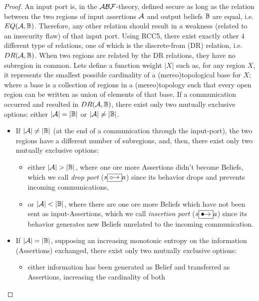 \begin{proof}
An input port is, in the $\mathcal{A}\mathcal{B}\mathcal{F}$-theory, defined secure as long as the relation
	between the two regions of input assertions $\mathcal{A}$ and
	output beliefs $\mathbb{B}$ are equal, i.e.
	$EQ(\mathcal{A},\mathbb{B})$. Therefore, any other relation
	should result in a weakness (related to an insecurity flaw) of that
	input port.  Using RCC5, there exist exactly other $4$ different type
	of relations, one of which is the discrete-from (DR) relation, i.e.
	$DR(\mathcal{A},\mathbb{B})$. When two regions are related by
	the DR relations, they have no subregion in common. Lets
	define a function weight $|X|$ such as, for any region $X$, it
	represents the smallest possible cardinality of a (mereo)topological base for
	$X$; where a base is a collection of regions in a (mereo)topology such that
	every open region can be written as union of elements of that base.  If
	a communication occurred and resulted in
	$DR(\mathcal{A},\mathbb{B})$, there exist only two mutually
	exclusive options: either $|\mathcal{A}|=|\mathbb{B}|$ or
	$|\mathcal{A}|\neq|\mathbb{B}|$. 
	\begin{itemize}
		\item If $|\mathcal{A}|\neq|\mathbb{B}|$ (at the end of
			a communication through the input-port), the two
			regions have a different number of subregions, and,
			then, there exist only two mutually exclusive options: 
			\begin{itemize}
				\item either $|\assertionRegion|>|\beliefRegion|$, where one
					ore more Assertions didn't become Beliefs, which we
					call \emph{drop port} ($s\fbox{\ensuremath {\mathrel{\circ\!\!\rightarrow}}} a$) since its behavior drops and
					prevents incoming communications,
				\item or $|\assertionRegion|<|\beliefRegion|$, where there are
					one ore more Beliefs which have not been sent as
					input-Assertions, which we call \emph{insertion
					port} ($s\fbox{\ensuremath {\mathrel{\bullet\!\!\rightarrow}}} a$) since its behavior generates new Beliefs
					unrelated to the incoming communication. 
			\end{itemize}
		\item If $|\mathcal{A}|=|\mathbb{B}|$, supposing an increasing monotonic entropy on the information (Assertions) exchanged, 
				there exist only two mutually exclusive options: 
			\begin{itemize}
				\item either information has been generated as Belief and transferred as Assertions, increasing the cardinality of both

\end{itemize}
\end{itemize}
\end{proof}
